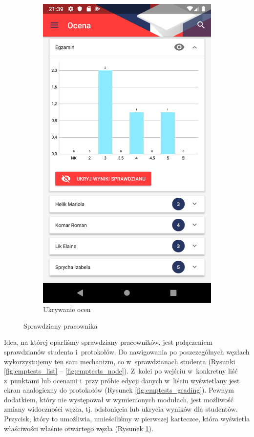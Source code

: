 \documentclass{pracamgr}
\begin{document}
\begin{figure}[p]
\begin{subfigure}[t]{0.3\textwidth}
		\includegraphics[width=\textwidth]{img/emptests_hide.png}
		\caption{Ukrywanie ocen}
		\label{fig:emptests_hide}
	\end{subfigure}
	\caption{Sprawdziany pracownika}\label{fig:emptests}
	\medskip
\end{figure}

Idea, na której oparliśmy sprawdziany pracowników, jest połączeniem sprawdzianów
studenta i~protokołów. Do nawigowania po poszczególnych węzłach wykorzystujemy
ten sam mechanizm, co w~sprawdzianach studenta (Rysunki \ref{fig:emptests_list} -- \ref{fig:emptests_node}). Z~kolei po wejściu w~konkretny
liść z~punktami lub ocenami i~przy próbie edycji danych w~liściu wyświetlany jest ekran
analogiczny do protokołów (Rysunek \ref{fig:emptests_grading}). Pewnym dodatkiem, który nie występował w wymienionych
modułach, jest możliwość zmiany widoczności węzła, tj. odsłonięcia lub ukrycia
wyników dla studentów. Przycisk, który to umożliwia, umieściliśmy w pierwszej
karteczce, która wyświetla właściwości właśnie otwartego węzła (Rysunek \ref{fig:emptests_hide}).
\end{document}
